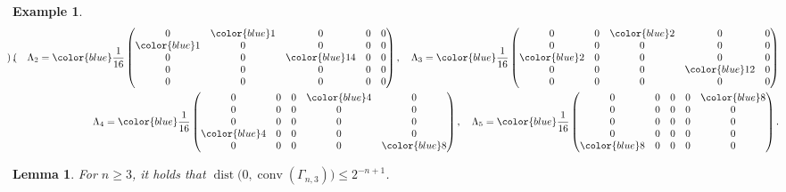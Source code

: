 \documentclass[10pt,a4paper]{article}
\newtheorem{lem}[thm]{Lemma}\crefname{lem}{Lemma}{Lemmas}
\newtheorem{exa}[thm]{Example}\crefname{exa}{Example}{Examples}
\numberwithin{equation}{section}
\DeclareMathOperator{\conv}{conv}
\DeclareMathOperator{\dist}{dist}
\begin{document}
\begin{exa}
\begin{align*}
\begin{pmatrix}
            \end{pmatrix},\quad
        \Lambda_2 = {\color{blue}\frac{1}{16}} \begin{pmatrix}
            0 & {\color{blue}1} & 0 & 0 & 0 \\ {\color{blue}1} & 0 & 0 & 0 & 0 \\ 0 & 0 & {\color{blue}14} & 0 & 0 \\ 0 & 0 & 0 & 0 & 0 \\ 0 & 0 & 0 & 0 & 0
            \end{pmatrix},\quad
        \Lambda_3 = {\color{blue}\frac{1}{16}} \begin{pmatrix}
            0 & 0 & {\color{blue}2} & 0 & 0 \\ 0 & 0 & 0 & 0 & 0 \\ {\color{blue}2} & 0 & 0 & 0 & 0 \\ 0 & 0 & 0 & {\color{blue}12} & 0 \\ 0 & 0 & 0 & 0 & 0
            \end{pmatrix}\\
        \Lambda_4 = {\color{blue}\frac{1}{16}} \begin{pmatrix}
            0 & 0 & 0 & {\color{blue}4} & 0 \\ 0 & 0 & 0 & 0 & 0 \\ 0 & 0 & 0 & 0 & 0 \\ {\color{blue}4} & 0 & 0 & 0 & 0 \\ 0 & 0 & 0 & 0 & {\color{blue}8}
            \end{pmatrix},\quad
        \Lambda_5 = {\color{blue}\frac{1}{16}} \begin{pmatrix}
            0 & 0 & 0 & 0 & {\color{blue}8} \\ 0 & 0 & 0 & 0 & 0 \\ 0 & 0 & 0 & 0 & 0 \\ 0 & 0 & 0 & 0 & 0 \\ {\color{blue}8} & 0 & 0 & 0 & 0
            \end{pmatrix}.
    \end{align*}
\end{exa}


\begin{lem}\label{lem:distKravtsov}
For $n \geq 3$, it holds that $\dist\big( 0, \conv(\Gamma_{n,3}) \big) \leq 2^{-n+1}$.
\end{lem}
\end{document}
